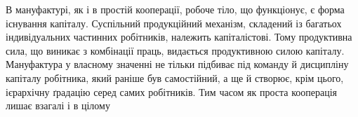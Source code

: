 В мануфактурі, як і в простій кооперації, робоче тіло, що функціонує,
є форма існування капіталу. Суспільний продукційний
механізм, складений із багатьох індивідуальних частинних робітників,
належить капіталістові. Тому продуктивна сила, що виникає
з комбінації праць, видається продуктивною силою капіталу.
Мануфактура у власному значенні не тільки підбиває під команду
й дисципліну капіталу робітника, який раніше був самостійний,
а ще й створює, крім цього, ієрархічну ґрадацію серед самих робітників.
Тим часом як проста кооперація лишає взагалі і в цілому
\parbreak{}  %
